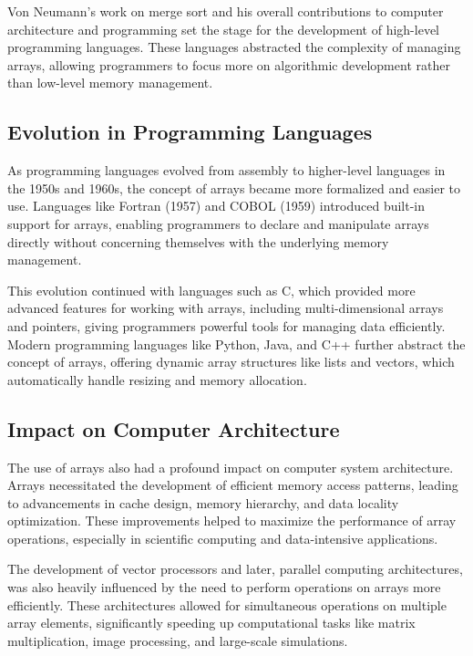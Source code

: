 \documentclass{book}
\begin{document}
	Von Neumann’s work on merge sort and his overall contributions to computer architecture and programming set the stage for the development of high-level programming languages. These languages abstracted the complexity of managing arrays, allowing programmers to focus more on algorithmic development rather than low-level memory management.
	
	\subsection{Evolution in Programming Languages}
	
	As programming languages evolved from assembly to higher-level languages in the 1950s and 1960s, the concept of arrays became more formalized and easier to use. Languages like Fortran (1957) and COBOL (1959) introduced built-in support for arrays, enabling programmers to declare and manipulate arrays directly without concerning themselves with the underlying memory management.
	
	This evolution continued with languages such as C, which provided more advanced features for working with arrays, including multi-dimensional arrays and pointers, giving programmers powerful tools for managing data efficiently. Modern programming languages like Python, Java, and C++ further abstract the concept of arrays, offering dynamic array structures like lists and vectors, which automatically handle resizing and memory allocation.
	
	\subsection{Impact on Computer Architecture}
	
	The use of arrays also had a profound impact on computer system architecture. Arrays necessitated the development of efficient memory access patterns, leading to advancements in cache design, memory hierarchy, and data locality optimization. These improvements helped to maximize the performance of array operations, especially in scientific computing and data-intensive applications.
	
	The development of vector processors and later, parallel computing architectures, was also heavily influenced by the need to perform operations on arrays more efficiently. These architectures allowed for simultaneous operations on multiple array elements, significantly speeding up computational tasks like matrix multiplication, image processing, and large-scale simulations.
	
\end{document}
